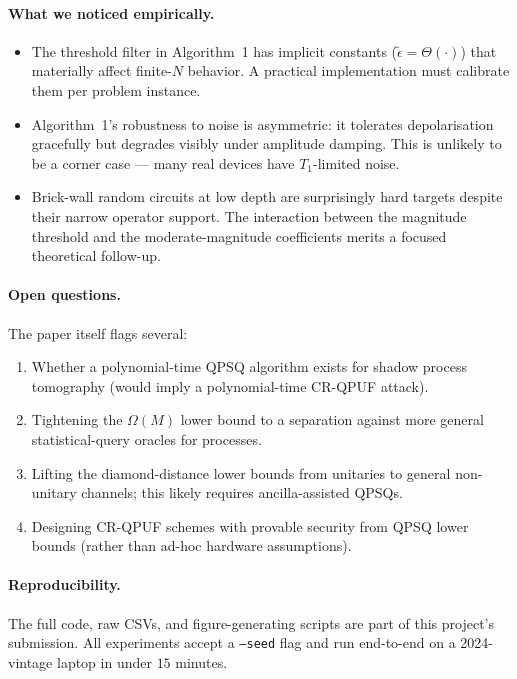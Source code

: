 \documentclass[11pt]{article}
\begin{document}
\paragraph{What we noticed empirically.}
\begin{itemize}[leftmargin=*]
  \item The threshold filter in Algorithm~1 has implicit constants
        ($\tilde\epsilon = \Theta(\cdot)$) that materially affect
        finite-$N$ behavior. A practical implementation must calibrate
        them per problem instance.
  \item Algorithm~1's robustness to noise is asymmetric: it tolerates
        depolarisation gracefully but degrades visibly under amplitude
        damping. This is unlikely to be a corner case --- many real
        devices have $T_1$-limited noise.
  \item Brick-wall random circuits at low depth are surprisingly hard
        targets despite their narrow operator support. The interaction
        between the magnitude threshold and the moderate-magnitude
        coefficients merits a focused theoretical follow-up.
\end{itemize}

\paragraph{Open questions.}
The paper itself flags several:
\begin{enumerate}[leftmargin=*]
  \item Whether a polynomial-time QPSQ algorithm exists for shadow
        process tomography (would imply a polynomial-time CR-QPUF
        attack).
  \item Tightening the $\Omega(M)$ lower bound to a separation against
        more general statistical-query oracles for processes.
  \item Lifting the diamond-distance lower bounds from unitaries to
        general non-unitary channels; this likely requires
        ancilla-assisted QPSQs.
  \item Designing CR-QPUF schemes with provable security from QPSQ
        lower bounds (rather than ad-hoc hardware assumptions).
\end{enumerate}

\paragraph{Reproducibility.}
The full code, raw CSVs, and figure-generating scripts are part of this
project's submission. All experiments accept a \texttt{--seed} flag and
run end-to-end on a 2024-vintage laptop in under $15$ minutes.



\end{document}
